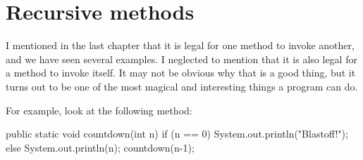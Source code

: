 





\section{Recursive methods}
\label{recursion}


I mentioned in the last chapter that it is legal for one method to invoke another, and we have seen several examples.
I neglected to mention that it is also legal for a method to invoke itself.
It may not be obvious why that is a good thing, but it turns out to be one of the most magical and interesting things a program can do.

For example, look at the following method:

\begin{code}
    public static void countdown(int n) {
        if (n == 0) {
            System.out.println("Blastoff!");
        } else {
            System.out.println(n);
            countdown(n-1);
        }
    }
\end{code}

